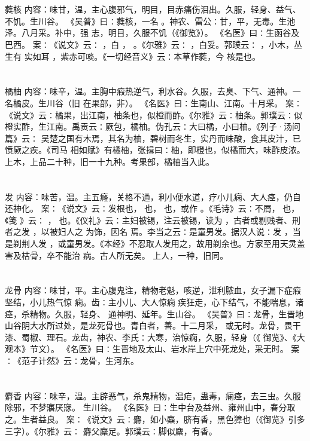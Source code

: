 \documentclass[12pt,UTF8]{ctexbook}
\begin{document}
\section{}蕤核
内容：味甘，温，主心腹邪气，明目，目赤痛伤泪出。久服，轻身、益气、不饥。生川谷。 
《吴普》曰∶蕤核，一名 。神农、雷公∶甘，平，无毒。生池泽。八月采。补中，强 
志，明目，久服不饥（《御览》）。 
《名医》曰∶生函谷及巴西。 
案∶《说文》云∶ ，白 ， 。《尔雅》云∶ ，白妥。郭璞云∶ ，小木，丛生有 
实如耳 ，紫赤可啖。《一切经音义》云∶本草作蕤，今 核是也。 


\section{}橘柚
内容：味辛，温。主胸中瘕热逆气，利水谷。久服，去臭、下气、通神。一名橘皮。生川谷（旧 
在果部，非）。 
《名医》曰∶生南山、江南。十月采。 
案∶《说文》云∶橘果，出江南，柚条也，似橙而酢。《尔雅》云∶柚条。郭璞云∶似 
橙实酢，生江南。禹贡云∶厥包，橘柚。伪孔云∶大曰橘，小曰柚。《列子·汤问篇》云∶ 
吴楚之国有木焉，其名为柚，碧树而冬生，实丹而味酸，食其皮汁，已愤厥之疾。《司马 
相如赋》有橘柚，张揖曰∶柚，即橙也，似橘而大，味酢皮浓。 
上木，上品二十种，旧一十九种。考果部，橘柚当入此。 


\section{}发
内容：味苦，温。主五癃，关格不通，利小便水道，疗小儿痫、大人痉，仍自还神化。 
案∶《说文》云∶发根也， 也， 也，或作 。《毛诗》云∶不屑， 也，《笺 
》云∶ ， 也。《仪礼》云∶主妇被锡，注云被锡，读为 ，古者或剔贱者、刑者之发 
，以被妇人之 为饰，因名 焉。李当之云∶是童男发。据汉人说∶发 ，当是剃荆人发 
，或童男发。《本经》不忍取人发用之，故用剃余也。方家至用天灵盖害及枯骨，卒不能治 
病。古人所无矣。 
上人，一种，旧同。 


\section{}龙骨
内容：味甘，平。主心腹鬼注，精物老魁，咳逆，泄利脓血，女子漏下症瘕坚结，小儿热气惊 
痫。齿∶主小儿、大人惊痫 疾狂走，心下结气，不能喘息，诸痉，杀精物。久服，轻身、 
通神明、延年。生山谷。 
《吴普》曰∶龙骨，生晋地山谷阴大水所过处，是龙死骨也。青白者，善。十二月采， 
或无时。龙骨，畏干漆、蜀椒、理石。龙齿，神农、李氏∶大寒，治惊痫，久服，轻身（《 
御览》、《大观本》节文）。 
《名医》曰∶生晋地及太山、岩水岸上穴中死龙处，采无时。 
案∶《范子计然》云∶龙骨，生河东。 


\section{}麝香
内容：味辛，温。主辟恶气，杀鬼精物，温疟，蛊毒，痫痉，去三虫。久服除邪，不梦寤厌寐。 
生川谷。 
《名医》曰∶生中台及益州、雍州山中，春分取之。生者益良。 
案∶《说文》云∶麝，如小麋，脐有香，黑色獐也（《御览》引多三字）。《尔雅》云∶ 
麝父麇足。郭璞云∶脚似麇，有香。 
\end{document}
